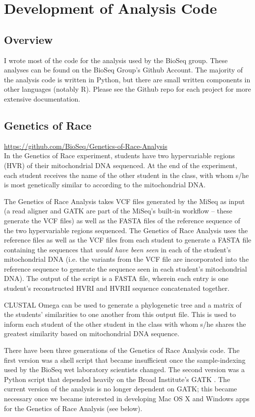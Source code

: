 \documentclass{report}
\begin{document}
\chapter{Development of Analysis Code}
\section{Overview}
I wrote most of the code for the analysis used by the BioSeq group. These analyses can be found on the BioSeq Group's Github Account. The majority of the analysis code is written in Python, but there are small written components in other languages (notably R). Please see the Github repo for each project for more extensive documentation.

\section{Genetics of Race}
\url{https://github.com/BioSeq/Genetics-of-Race-Analysis} \\

\noindent In the Genetics of Race experiment, students have two hypervariable regions (HVR) of their mitochondrial DNA sequenced. At the end of the experiment, each student receives the name of the other student in the class, with whom s/he is most genetically similar to according to the mitochondrial DNA. 

The Genetics of Race Analysis takes VCF files generated by the MiSeq as input (a read aligner and GATK are part of the MiSeq's built-in workflow -- these generate the VCF files) as well as the FASTA files of the reference sequence of the two hypervariable regions sequenced. The Genetics of Race Analysis uses the reference files as well as the VCF files from each student to generate a FASTA file containing the sequences that \emph{would have been seen} in each of the student's mitochondrial DNA (i.e. the variants from the VCF file are incorporated into the reference sequence to generate the sequence seen in each student's mitochondrial DNA). The output of the script is a FASTA file, wherein each entry is one student's reconstructed HVRI and HVRII sequence concatenated together.

CLUSTAL Omega can be used to generate a phylogenetic tree and a matrix of the students' similarities to one another from this output file. This is used to inform each student of the other student in the class with whom s/he shares the greatest similarity based on mitochondrial DNA sequence.

There have been three generations of the Genetics of Race Analysis code. The first version was a shell script that became insufficient once the sample-indexing used by the BioSeq wet laboratory scientists changed. The second version was a Python script that depended heavily on the Broad Institute's GATK  \cite{mckenna2010genome}. The current version of the analysis is no longer dependent on GATK; this became necessary once we became interested in developing Mac OS X and Windows apps for the Genetics of Race Analysis (see below).
\end{document}
